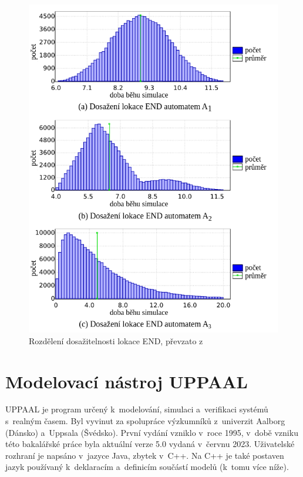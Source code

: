 \begin{figure}[H]
\begin{minipage}[b]{.49\linewidth}
    \includegraphics[width=\linewidth]{obrazky-figures/sta_reachability.png}
    \caption{Rozdělení dosažitelnosti lokace END, převzato z~\cite{uppaal_smc}}
    \label{fig:sta_reachability}
  \end{minipage}\hfill
\end{figure}

\section{Modelovací nástroj UPPAAL} \label{uppaal}
UPPAAL je program určený k~modelování, simulaci a~verifikaci systémů s~realným časem. Byl vyvinut za spolupráce výzkumníků z~univerzit Aalborg (Dánsko) a~Uppsala (Švédsko). První vydání vzniklo v~roce 1995, v~době vzniku této bakalářské práce byla aktuální verze 5.0 vydaná v~červnu 2023. Uživatelské rozhraní je napsáno v~jazyce Java, zbytek v~C++. Na C++ je také postaven jazyk používaný k~deklaracím a~definicím součástí modelů (k~tomu více níže).

